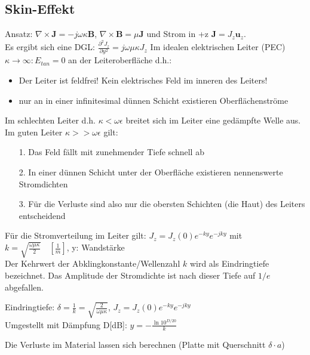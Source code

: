 \documentclass[english]{latex4ei/latex4ei_sheet}
\begin{document}
\begin{sectionbox}
    \subsection{Skin-Effekt}
    Ansatz: $\nabla \times \mathbf{J} = -j\omega\kappa \mathbf{B}$, $\nabla\times\mathbf{B} = \mu \mathbf{J}$ und Strom in +z $\mathbf{J} = J_z \mathbf{u}_z$.\\
    Es ergibt sich eine DGL: $\frac{\partial^2 J_z}{\partial y^2} = j\omega \mu \kappa J_z$
    Im idealen elektrischen Leiter (PEC) $\kappa \to \infty: E_{tan} = 0$ an der Leiteroberfläche d.h.:\\
    \begin{itemize}
        \item Der Leiter ist feldfrei! Kein elektrisches Feld im inneren des Leiters!
        \item nur an in einer infinitesimal dünnen Schicht existieren Oberflächenströme
    \end{itemize}
    Im schlechten Leiter d.h. $\kappa < \omega\epsilon$ breitet sich im Leiter eine gedämpfte Welle aus.\\
    Im guten Leiter $\kappa >> \omega\epsilon$ gilt:
    \begin{itemize}
        \item[1.] Das Feld fällt mit zunehmender Tiefe schnell ab
        \item[2.] In einer dünnen Schicht unter der Oberfläche existieren nennenswerte Stromdichten
        \item[3.] Für die Verluste sind also nur die obersten Schichten (die Haut) des Leiters entscheidend
    \end{itemize}
    Für die Stromverteilung im Leiter gilt: $J_z = J_z(0) e^{-ky} e^{-jky}$ mit $k = \sqrt{\frac{\omega\mu\kappa}{2}}\quad[\frac{1}{m}]$, y: Wandstärke\\
    Der Kehrwert der Abklingkonstante/Wellenzahl $k$ wird als Eindringtiefe bezeichnet. Das Amplitude der Stromdichte ist nach dieser Tiefe auf $1/e$ abgefallen.
    \begin{emphbox}
        Eindringtiefe: $\delta = \frac{1}{k} = \sqrt{\frac{2}{\omega \mu \kappa}}$, $J_z = J_z(0) e^{-ky} e^{-jky}$\\
        Umgestellt mit Dämpfung D[dB]: $y = -\frac{\operatorname{ln}10^{D/20}}{k}$
    \end{emphbox}
    Die Verluste im Material lassen sich berechnen (Platte mit Querschnitt $\delta \cdot a$)\\

\end{sectionbox}
\end{document}
